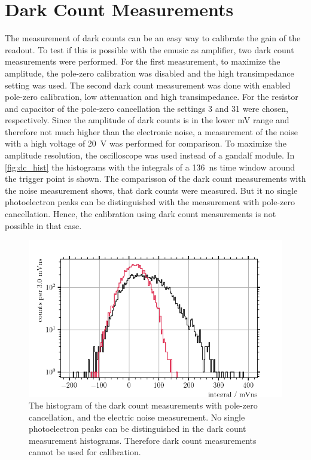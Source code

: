 \section{Dark Count Measurements}
The measurement of dark counts can be an easy way to calibrate the gain of the readout.
To test if this is possible with the \ac{emusic} as amplifier, two dark count measurements were performed.
For the first measurement, to maximize the amplitude, the pole-zero calibration was disabled and the high transimpedance setting was used.
The second dark count measurement was done with enabled pole-zero calibration, low attenuation and high transimpedance.
For the resistor and capacitor of the pole-zero cancellation the settings 3 and 31 were chosen, respectively.
Since the amplitude of dark counts is in the lower \si{\milli\volt} range and therefore not much higher than the electronic noise, a measurement of the noise with a high voltage of \SI{20}{\volt} was performed for comparison.
To maximize the amplitude resolution, the oscilloscope was used instead of a \ac{gandalf} module.
In \autoref{fig:dc_hist} the histograms with the integrals of a \SI{136}{\nano\second} time window around the trigger point is shown. 
The comparisson of the dark count measurements with the noise measurement shows, that dark counts were measured.
But it no single photoelectron peaks can be distinguished with the measurement with pole-zero cancellation.
Hence, the calibration using dark count measurements is not possible in that case.
\begin{figure}
	\centering
	\includegraphics[width=1.\textwidth]{pictures/dc_hist_pz}
	\caption[Histogram of the dark count measurements with pole-zero cancellation.]{The histogram of the dark count measurements with pole-zero cancellation, and the electric noise measurement. No single photoelectron peaks can be distinguished in the dark count measurement histograms. Therefore dark count measurements cannot be used for calibration.} 
	\label{fig:dc_hist}
\end{figure}
